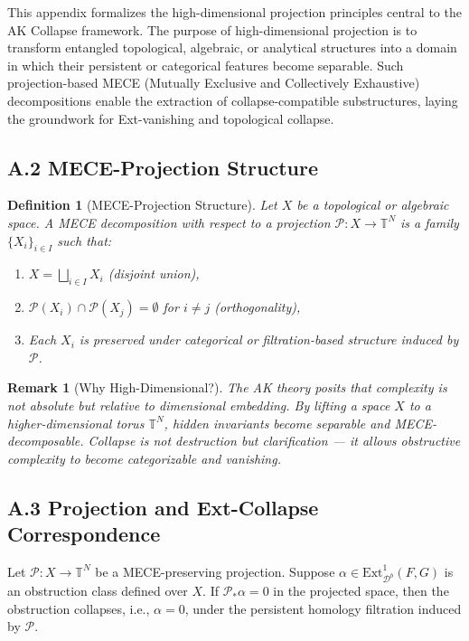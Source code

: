 \documentclass[11pt]{article}
\newtheorem{definition}[theorem]{Definition}
\newtheorem{remark}[theorem]{Remark}
\begin{document}
This appendix formalizes the high-dimensional projection principles central to the AK Collapse framework. The purpose of high-dimensional projection is to transform entangled topological, algebraic, or analytical structures into a domain in which their persistent or categorical features become separable.  
Such projection-based MECE (Mutually Exclusive and Collectively Exhaustive) decompositions enable the extraction of collapse-compatible substructures, laying the groundwork for Ext-vanishing and topological collapse.

\subsection*{A.2 MECE-Projection Structure}

\begin{definition}[MECE-Projection Structure]
Let $X$ be a topological or algebraic space. A MECE decomposition with respect to a projection $\mathcal{P}: X \to \mathbb{T}^N$ is a family $\{X_i\}_{i \in I}$ such that:
\begin{enumerate}
  \item $X = \bigsqcup_{i \in I} X_i$ (disjoint union),
  \item $\mathcal{P}(X_i) \cap \mathcal{P}(X_j) = \emptyset$ for $i \ne j$ (orthogonality),
  \item Each $X_i$ is preserved under categorical or filtration-based structure induced by $\mathcal{P}$.
\end{enumerate}
\end{definition}

\begin{remark}[Why High-Dimensional?]
The AK theory posits that complexity is not absolute but relative to dimensional embedding.  
By lifting a space $X$ to a higher-dimensional torus $\mathbb{T}^N$, hidden invariants become separable and MECE-decomposable.  
Collapse is not destruction but clarification — it allows obstructive complexity to become categorizable and vanishing.
\end{remark}

\subsection*{A.3 Projection and Ext-Collapse Correspondence}

\begin{lemma}
Let $\mathcal{P} : X \to \mathbb{T}^N$ be a MECE-preserving projection.  
Suppose $\alpha \in \mathrm{Ext}^1_{\mathcal{D}^b}(F, G)$ is an obstruction class defined over $X$.  
If $\mathcal{P}_\ast \alpha = 0$ in the projected space, then the obstruction collapses, i.e., $\alpha = 0$, under the persistent homology filtration induced by $\mathcal{P}$.
\end{lemma}
\end{document}
